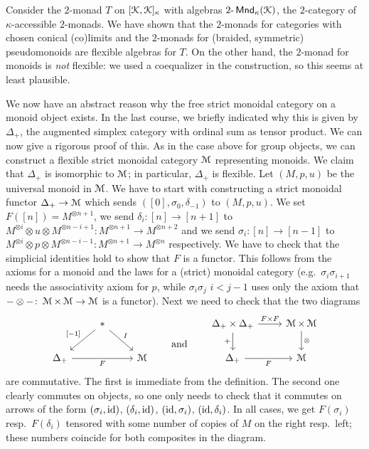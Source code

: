 \documentclass[a4paper,11pt,oneside,openany]{scrbook}
\begin{document}
\begin{exmp}
    Consider the $2$-monad $T$ on $[\operatorname{\mathcal{K}},\operatorname{\mathcal{K}}]_{\kappa}$ with algebras $2\mbox{-}\operatorname{\mathsf{Mnd}}_{\kappa}(\operatorname{\mathcal{K}})$, the $2$-category of $\kappa$-accessible $2$-monads. We have shown that the $2$-monads for categories with chosen conical (co)limits and the $2$-monads for (braided, symmetric) pseudomonoids are flexible algebras for $T$. On the other hand, the $2$-monad for monoids is \emph{not} flexible: we used a coequalizer in the construction, so this seems at least plausible.
\end{exmp}
\begin{exmp}
    We now have an abstract reason why the free strict monoidal category on a monoid object exists. In the last course, we briefly indicated why this is given by $\Delta_+$, the augmented simplex category with ordinal sum as tensor product. We can now give a rigorous proof of this.
    As in the case above for group objects, we can construct a flexible strict monoidal category $\operatorname{\mathcal{M}}$ representing monoids. We claim that $\Delta_+$ is isomorphic to $\operatorname{\mathcal{M}}$; in particular, $\Delta_+$ is flexible. Let $(M,p,u)$ be the universal monoid in $\operatorname{\mathcal{M}}$. We have to start with constructing a strict monoidal functor $\Delta_+\to\operatorname{\mathcal{M}}$ which sends $([0],\sigma_0,\delta_{-1})$ to $(M,p,u)$. We set $F([n])=M^{\otimes n+1}$, we send $\delta_i\colon [n]\to [n+1]$ to $M^{\otimes i}\otimes u \otimes M^{\otimes n-i+1}\colon M^{\otimes n+1}\to M^{\otimes n+2}$ and we send $\sigma_i\colon [n]\to [n-1]$ to $M^{\otimes i}\otimes p \otimes M^{\otimes n-i-1}\colon M^{\otimes n+1}\to M^{\otimes n}$ respectively. We have to check that the simplicial identities hold to show that $F$ is a functor. This follows from the axioms for a monoid and the laws for a (strict) monoidal category (e.g.\ $\sigma_i\sigma_{i+1}$ needs the associativity axiom for $p$, while $\sigma_i\sigma_j$ $i<j-1$ uses only the axiom that $-\otimes-\colon \operatorname{\mathcal{M}}\times \operatorname{\mathcal{M}}\to \operatorname{\mathcal{M}}$ is a functor). Next we need to check that the two diagrams 
    \[\begin{tikzcd}
	& {*} && {} & {\Delta_+\times\Delta_+} & \M\times\M \\
	{\Delta_+} && \M & {} & {\Delta_+} & \M
	\arrow["{[-1]}"', from=1-2, to=2-1]
	\arrow["F"', from=2-1, to=2-3]
	\arrow["I", from=1-2, to=2-3]
	\arrow["{\text{\normalsize and}}"{description}, draw=none, from=1-4, to=2-4]
	\arrow["{+}"', from=1-5, to=2-5]
	\arrow["{F\times F}", from=1-5, to=1-6]
	\arrow["\otimes", from=1-6, to=2-6]
	\arrow["F"', from=2-5, to=2-6]
\end{tikzcd}\]
are commutative. The first is immediate from the definition. The second one clearly commutes on objects, so one only needs to check that it commutes on arrows of the form $(\sigma_i,\operatorname{id})$, $(\delta_i,\operatorname{id})$, $(\operatorname{id},\sigma_i)$, $(\operatorname{id}, \delta_i)$. In all cases, we get $F(\sigma_i)$ resp.\ $F(\delta_i)$ tensored with some number of copies of $M$ on the right resp.\ left; these numbers coincide for both composites in the diagram. 


\end{exmp}
\end{document}
